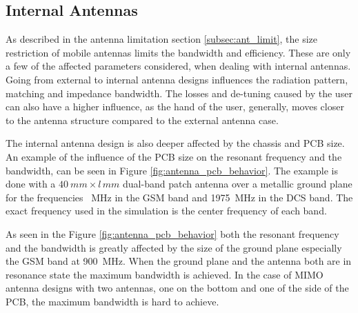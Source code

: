 \subsection{Internal Antennas}
As described in the antenna limitation section \ref{subsec:ant_limit}, the size restriction of mobile antennas limits the bandwidth and efficiency.
These are only a few of the affected parameters considered, when dealing with internal antennas. Going from external to internal antenna designs influences the radiation pattern, matching and impedance bandwidth. The losses and de-tuning caused by the user can also have a higher influence, as the hand of the user, generally, moves closer to the antenna structure compared to the external antenna case\cite{fujimoto2008mobile}. 

The internal antenna design is also deeper affected by the chassis and PCB size\cite{sanchez2008multiband}. An example of the influence of the PCB size on the resonant frequency and the bandwidth, can be seen in Figure \ref{fig:antenna_pcb_behavior}. The example is done with a $\SI{40}{mm} \times l\,\si{mm}$ dual-band patch antenna over a metallic ground plane for the frequencies \SI{}{MHz} in the GSM band and \SI{1975}{MHz} in the DCS band. The exact frequency used in the simulation is the center frequency of each band. 

As seen in the Figure \ref{fig:antenna_pcb_behavior} both the resonant frequency and the bandwidth is greatly affected by the size of the ground plane especially the GSM band at \SI{900}{MHz}. When the ground plane and the antenna both are in resonance state the maximum bandwidth is achieved. In the case of MIMO antenna designs with two antennas, one on the bottom and one of the side of the PCB, the maximum bandwidth is hard to achieve\cite{sanchez2008multiband}. 

